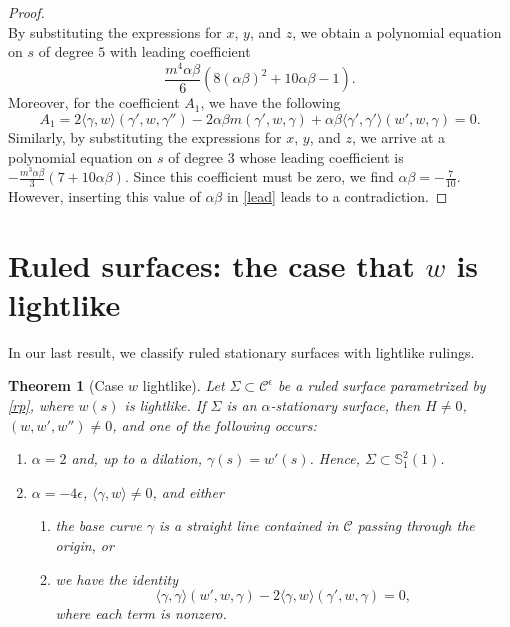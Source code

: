 \documentclass[a4paper,12pt]{amsart}
\newtheorem{theorem}{Theorem}[section]
\theoremstyle{definition}
\def\s{\mathbb S}
\begin{document}
\begin{proof}
$$$$
By substituting the expressions for $x$, $y$, and $z$, we obtain a polynomial equation on $s$ of degree $5$ with leading coefficient 
\begin{equation}
\frac{m^{4}\alpha\beta}{6}(8(\alpha\beta)^2+10\alpha\beta-1). \label{lead}
\end{equation}
Moreover, for the coefficient $A_1$, we have the following
$$
A_1=2\langle \gamma, w \rangle (\gamma',w,\gamma'')-2\alpha \beta m (\gamma',w,\gamma)+\alpha\beta\langle \gamma',\gamma' \rangle (w',w,\gamma)=0.
$$
Similarly, by substituting the expressions for $x$, $y$, and $z$, we arrive at a polynomial equation on $s$ of degree $3$ whose leading coefficient is $-\frac{m^{3}\alpha\beta}{3}(7+10\alpha\beta)$. Since this coefficient must be zero, we find $\alpha\beta=-\frac{7}{10}$. However, inserting this value of $\alpha\beta$ in \eqref{lead} leads to a contradiction.
\end{proof}

\section{Ruled surfaces: the case that $w$ is lightlike}\label{s5}
In our last result, we classify  ruled stationary surfaces with lightlike rulings.

\begin{theorem}[Case $w$   lightlike] \label{th-li}
Let $\Sigma\subset\mathcal{C}^\epsilon$ be a ruled surface parametrized by \eqref{rp}, where $w(s)$ is lightlike. If $\Sigma$ is an $\alpha$-stationary surface, then $H \neq 0$, $(w,w',w'') \neq 0$, and one of the following occurs:
\begin{enumerate}
 \item $\alpha=2$ and, up to a dilation, $\gamma(s)=w'(s)$. Hence, $\Sigma\subset \s^2_1(1)$.
 \item $\alpha=-4\epsilon$, $\langle \gamma ,w\rangle \neq 0$, and either
\begin{enumerate}
\item[\text{(2a)}] the base curve $\gamma$ is a straight line contained in $\mathcal{C}$   passing through the origin, or 
\item [\text{(2b)}] we have the identity
\begin{equation}
\langle \gamma,\gamma \rangle (w',w,\gamma)-2\langle \gamma,w\rangle (\gamma',w,\gamma)=0, \label{th-li2}
\end{equation}
where each term is nonzero.
\end{enumerate}
\end{enumerate}
\end{theorem}
\end{document}
